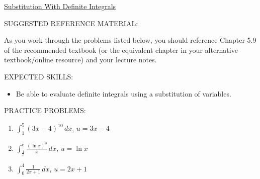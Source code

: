 \documentclass[12pt]{article}
\newif\ifans
\begin{document}
\begin{center}
\underline{\LARGE{Substitution With Definite Integrals}}
\end{center}

\noindent SUGGESTED REFERENCE MATERIAL:

\bigskip

\noindent As you work through the problems listed below, you should reference Chapter 5.9 of the recommended textbook (or the equivalent chapter in your alternative textbook/online resource) and your lecture notes.

\bigskip


\noindent EXPECTED SKILLS:

\begin{itemize}

\item Be able to evaluate definite integrals using a substitution of variables.

\end{itemize}

\noindent PRACTICE PROBLEMS:

\medskip


\begin{enumerate}

\item $\int_1^5 (3x-4)^{10} \,dx$, $u=3x-4$

\ifans{\fbox{$\frac{1}{3}\int_{-1}^{11} u^{10} \,du$}} \fi

\item $\int_{\frac{1}{e}}^{e} \frac{(\ln{x})^3}{x} \,dx$, $u=\ln{x}$

\ifans{\fbox{$\int_{-1}^1 u^3 \,du$}} \fi

\item $\int_0^4 \frac{1}{2x+1} \,dx$, $u=2x+1$

\ifans{\fbox{$\frac{1}{2} \int_1^9 \frac{1}{u} \,du$}} \fi

\end{enumerate}

\end{document}
